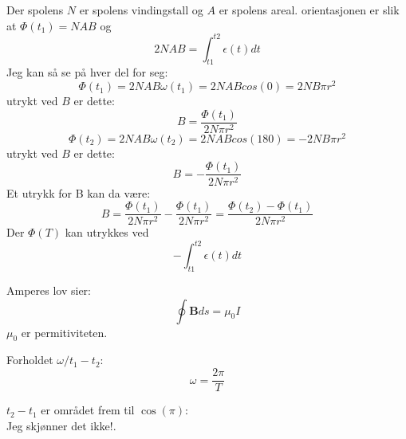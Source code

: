 \documentclass[12pt,a4paper,leqno]{report}
\begin{document}
Der spolens $N$ er spolens vindingstall og $A$ er spolens areal.
orientasjonen er slik at $\Phi(t_1)=NAB$ og 
\begin{equation}
2NAB=\int_{t1}^{t2}\epsilon(t)dt
\end{equation}
Jeg kan så se på hver del for seg:
\begin{equation}
\Phi(t_1)=2NAB\omega(t_1)=2NABcos(0)=2NB\pi r^2
\end{equation}
utrykt ved $B$ er dette:
\begin{equation}
B=\frac{\Phi(t_1)}{2N \pi r^2}
\end{equation}
\begin{equation}
\Phi(t_2)=2NAB\omega(t_2)=2NABcos(180)=-2NB\pi r^2
\end{equation}
utrykt ved $B$ er dette:
\begin{equation}
B=-\frac{\Phi(t_1)}{2N \pi r^2}
\end{equation}
Et utrykk for B kan da være:
\begin{equation}
B=\frac{\Phi(t_1)}{2N \pi r^2}-\frac{\Phi(t_1)}{2N \pi r^2}=\frac{\Phi(t_2)-\Phi(t_1)}{2N \pi r^2}
\end{equation}
Der $\Phi(T)$ kan utrykkes ved
\begin{equation}
-\int_{t1}^{t2}\epsilon(t)dt
\end{equation}

Amperes lov sier:
\begin{equation}
\oint \mathbf{B} ds=\mu_0I
\end{equation}
$\mu_0$ er permitiviteten.

Forholdet $\omega/t_1-t_2$:
\begin{equation}
\omega=\frac{2 \pi} {T}
\end{equation}


$t_2-t_1$ er området frem til $\cos(\pi)$:\\
Jeg skjønner det ikke!.	
\end{document}
